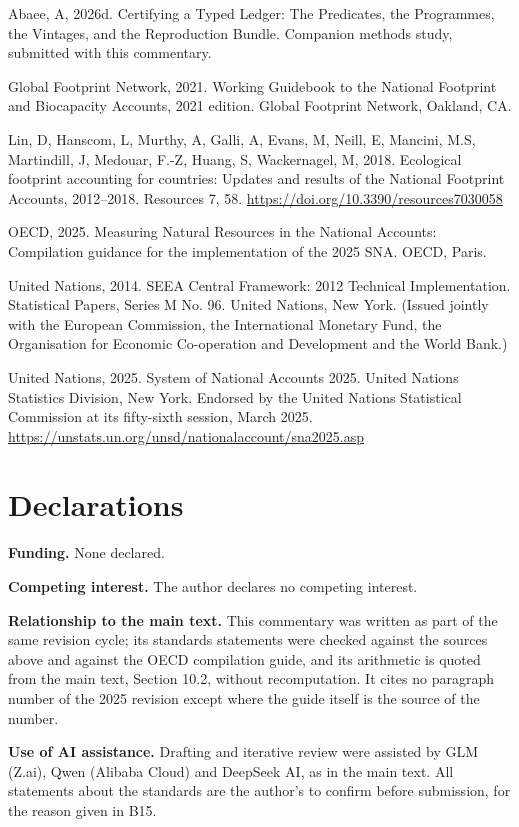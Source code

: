\documentclass[11pt]{article}
\begin{document}
Abaee, A, 2026d. Certifying a Typed Ledger: The Predicates, the Programmes, the Vintages, and the Reproduction Bundle. Companion methods study, submitted with this commentary.

Global Footprint Network, 2021. Working Guidebook to the National Footprint and Biocapacity Accounts, 2021 edition. Global Footprint Network, Oakland, CA.

Lin, D, Hanscom, L, Murthy, A, Galli, A, Evans, M, Neill, E, Mancini, M.S, Martindill, J, Medouar, F.-Z, Huang, S, Wackernagel, M, 2018. Ecological footprint accounting for countries: Updates and results of the National Footprint Accounts, 2012--2018. Resources 7, 58. \url{https://doi.org/10.3390/resources7030058}

OECD, 2025. Measuring Natural Resources in the National Accounts: Compilation guidance for the implementation of the 2025 SNA. OECD, Paris.

United Nations, 2014. SEEA Central Framework: 2012 Technical Implementation. Statistical Papers, Series M No. 96. United Nations, New York. (Issued jointly with the European Commission, the International Monetary Fund, the Organisation for Economic Co-operation and Development and the World Bank.)

United Nations, 2025. System of National Accounts 2025. United Nations Statistics Division, New York. Endorsed by the United Nations Statistical Commission at its fifty-sixth session, March 2025. \url{https://unstats.un.org/unsd/nationalaccount/sna2025.asp}

\vspace{0.8em}

\section*{Declarations}\label{declarations}

\textbf{Funding.} None declared.

\textbf{Competing interest.} The author declares no competing interest.

\textbf{Relationship to the main text.} This commentary was written as part of the same revision cycle; its standards statements were checked against the sources above and against the OECD compilation guide, and its arithmetic is quoted from the main text, Section 10.2, without recomputation. It cites no paragraph number of the 2025 revision except where the guide itself is the source of the number.

\textbf{Use of AI assistance.} Drafting and iterative review were assisted by GLM (Z.ai), Qwen (Alibaba Cloud) and DeepSeek AI, as in the main text. All statements about the standards are the author's to confirm before submission, for the reason given in B15.
\end{document}
